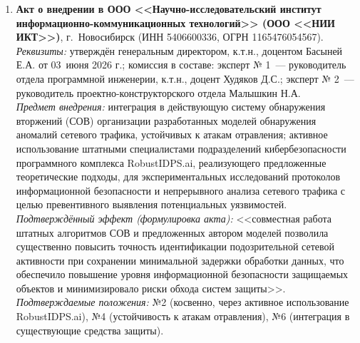 \documentclass[11pt,a4paper]{article}
\begin{document}
\begin{enumerate}[leftmargin=*, itemsep=0.5em]

\item \textbf{Акт о внедрении в ООО <<Научно-исследовательский институт информационно-коммуникационных технологий>> (ООО <<НИИ ИКТ>>)}, г.~Новосибирск (ИНН 5406600336, ОГРН 1165476054567). \\
\textit{Реквизиты:} утверждён генеральным директором, к.т.н., доцентом Басыней Е.А. от 03~июня 2026 г.; комиссия в составе: эксперт № 1~--- руководитель отдела программной инженерии, к.т.н., доцент Худяков Д.С.; эксперт № 2~--- руководитель проектно-конструкторского отдела Малышкин Н.А. \\
\textit{Предмет внедрения:} интеграция в действующую систему обнаружения вторжений (СОВ) организации разработанных моделей обнаружения аномалий сетевого трафика, устойчивых к атакам отравления; активное использование штатными специалистами подразделений кибербезопасности программного комплекса RobustIDPS.ai, реализующего предложенные теоретические подходы, для экспериментальных исследований протоколов информационной безопасности и непрерывного анализа сетевого трафика с целью превентивного выявления потенциальных уязвимостей. \\
\textit{Подтверждённый эффект (формулировка акта):} <<совместная работа штатных алгоритмов СОВ и предложенных автором моделей позволила существенно повысить точность идентификации подозрительной сетевой активности при сохранении минимальной задержки обработки данных, что обеспечило повышение уровня информационной безопасности защищаемых объектов и минимизировало риски обхода систем защиты>>. \\
\textit{Подтверждаемые положения:} №2 (косвенно, через активное использование RobustIDPS.ai), №4 (устойчивость к атакам отравления), №6 (интеграция в существующие средства защиты).


\end{enumerate}
\end{document}
